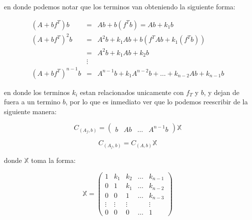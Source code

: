 \begin{enumerate}
                en donde podemos notar que los terminos van obteniendo la siguiente forma:

                \begin{eqnarray*}
                    \left( A + b f^T \right) b & = & A b + b (f^T b) = A b + k_1 b\\
                    \left( A + b f^T \right)^{2} b & = & A^2 b + k_1 A b + b (f^T A b + k_1 (f^T b)) \\
                    & = & A^2 b + k_1 A b + k_2 b \\
                    & \vdots & \\
                    \left( A + b f^T \right)^{n-1} b & = & A^{n-1} b + k_1 A^{n-2} b + \dots + k_{n-2} A b + k_{n-1} b
                \end{eqnarray*}

                en donde los terminos $k_i$ estan relacionados unicamente con $f_T$ y $b$, y dejan de fuera a un termino $b$, por lo que es inmediato ver que lo podemos reescribir de la siguiente manera:

                \begin{equation*}
                    C_{(A_f, b)} =
                    \begin{pmatrix}
                    b & A b & \dots & A^{n-1} b
                    \end{pmatrix} \mathbb{X}
                \end{equation*}

                \begin{equation}
                    C_{(A_f, b)} = C_{(A, b)} \mathbb{X}
                \end{equation}

                donde $\mathbb{X}$ toma la forma:

                \begin{equation*}
                    \mathbb{X} =
                    \begin{pmatrix}
                        1 & k_1 & k_2 & \dots & k_{n-1} \\
                        0 & 1 & k_1 & \dots & k_{n-2} \\
                        0 & 0 & 1 & \dots & k_{n-3} \\
                        \vdots & \vdots & \vdots & & \vdots \\
                        0 & 0 & 0 & \dots & 1
                    \end{pmatrix}
                \end{equation*}


\end{enumerate}
